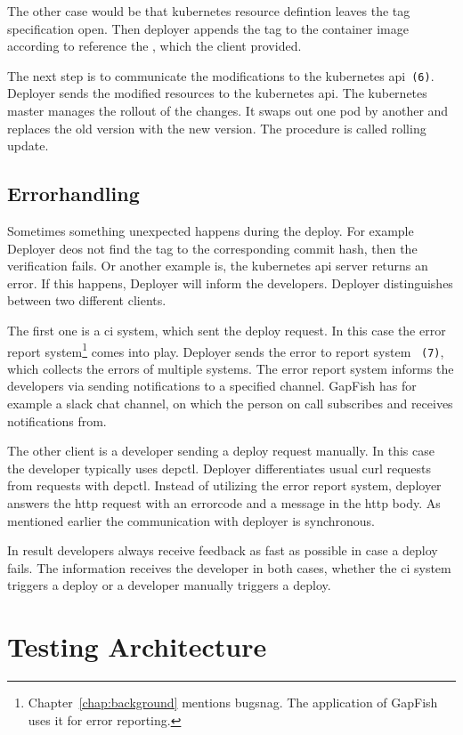 The other case would be that kubernetes resource defintion leaves the tag specification
open. Then deployer appends the tag to the container image according to reference the
, which the client provided.

The next step is to communicate the modifications to the kubernetes
api~\texttt{(6)}. Deployer sends the modified resources to the kubernetes api. The
kubernetes master manages the rollout of the changes. It swaps out one pod by another and
replaces the old version with the new version. The procedure is called rolling update.

\subsection{Errorhandling}

Sometimes something unexpected happens during the deploy. For example Deployer deos not
find the tag to the corresponding commit hash, then the verification fails. Or another
example is, the kubernetes api server returns an error. If this happens, Deployer will
inform the developers. Deployer distinguishes between two different clients.

The first one is a \gls{ci} system, which sent the deploy request. In this case the error
report system\footnote{Chapter~\ref{chap:background} mentions bugsnag. The application of
  GapFish uses it for error reporting.} comes into play. Deployer sends the error to
report system ~\texttt{(7)}, which collects the errors of multiple systems. The error
report system informs the developers via sending notifications to a specified
channel. GapFish has for example a slack chat channel, on which the person on call
subscribes and receives notifications from.

The other client is a developer sending a deploy request manually. In this case the
developer typically uses depctl. Deployer differentiates usual curl requests from requests
with depctl. Instead of utilizing the error report system, deployer answers the http
request with an errorcode and a message in the http body. As mentioned earlier the
communication with deployer is synchronous.

In result developers always receive feedback as fast as possible in case a deploy
fails. The information receives the developer in both cases, whether the \gls{ci} system
triggers a deploy or a developer manually triggers a deploy.

\section{Testing Architecture}
\label{test_architecture}

